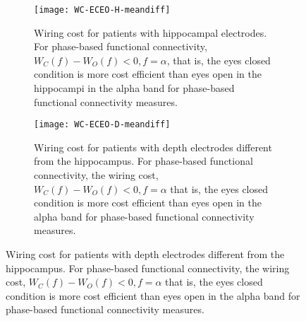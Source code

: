 \documentclass[11pt, onecolumn]{article}
\begin{document}
\begin{figure}[h] 
\begin{adjustbox}{minipage=\linewidth,scale=0.9}
  \begin{subfigure}[t]{0.5\linewidth}
    \centering
    \texttt{[image: WC-ECEO-H-meandiff]} 
    \caption{Wiring cost for patients with hippocampal electrodes. For phase-based functional connectivity, $W_C(f) - W_O(f) <0, f = \alpha$, that is, the eyes closed condition is more cost efficient than eyes open in the hippocampi in the alpha band for phase-based functional connectivity measures.} 
    \label{mesosfigi-2:a} 
  \end{subfigure}%
  \hspace{1ex}
  \begin{subfigure}[t]{0.5\linewidth}
    \centering
    \texttt{[image: WC-ECEO-D-meandiff]} 
    \caption{Wiring cost for patients with depth electrodes different from the hippocampus. For phase-based functional connectivity, the wiring cost, $W_C(f) - W_O(f) <0, f = \alpha$ that is, the eyes closed condition is more cost efficient than eyes open in the alpha band for phase-based functional connectivity measures.} 
    \label{mesosfigi-2:b} 
  \end{subfigure} 
  

\end{adjustbox}
\end{figure}
\end{document}
